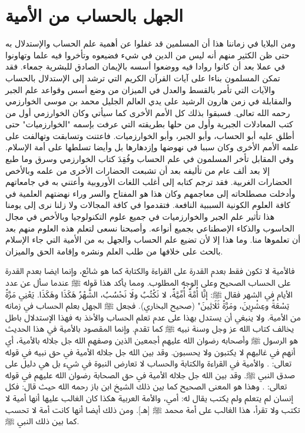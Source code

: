 \section{الجهل بالحساب من الأمية}

ومن البلايا في زماننا هذا أن المسلمين قد غفلوا عن أهمية علم الحساب والإستدلال به حتى ظن الكثير منهم أنه ليس من الدين في شيء فضيعوه وتأخروا فيه علما وتهاونوا في عملا بعد أن كانوا روادا فيه ووضعوا أسسه بالإيمان الصادق للبشرية جمعاء. فقد تمكن المسلمون  بناءا على آيات القرآن الكريم التي ترشد إلى الإستدلال بالحساب والآيات التي تأمر بالقسط والعدل في الميزان من وضع أسس وقواعد علم الجبر والمقابلة في زمن هارون الرشيد على يدي العالم الجليل محمد بن موسى الخوارزمي رحمه الله تعالى. فسبقوا بذلك كل الأمم الأخرى كما سيأتي وكان الخوارزمي أول من كتب المعادلات الجبرية وأول من حلها بطريقته التي عرفت بإسمه "الخوارزميات" حتى أطلق عليه أبو الحساب، وأبو الجبر، وأبو الخوارزميات. فاعتنت وتسابقت وتهالفت على علمه الأمم الأخرى وكان سببا في نهوضها وإزدهارها بل وأيضا تسلطها على أمة الإسلام. وفي المقابل تأخر المسلمون في علم الحساب وفُقِدَ كتاب الخوارزمي وسرق وما طبع إلا بعد ألف عام من تأليفه بعد أن تشبعت الحضارات الأخرى من علمه وبالأخص الحضارات الغربية. فقد ترجم كتابه إلى أغلب اللغات الأوروبية وأعتني به في جامعاتهم وأدخلت مصطلحاته إلى معاجمهم وكان هذا هو المفتاح والسر وراء نهضتهم العلمية في كافة العلوم الكونية السببية النافعة. فتقدموا في كافة المجالات ولا زلنا نرى إلى يومنا هذا تأثير علم الجبر والخوارزميات في جميع علوم التكنولوجيا وبالأخص في مجال الحاسوب والذكاء الإصطناعي بجميع أنواعه. وأصبحنا نسعى لتعلم هذه العلوم منهم بعد أن تعلموها منا. وما هذا إلا لأن تضيع علم الحساب والجهل به من الأمية التي جاء الإسلام بالحث على خلافها من طلب العلم ونشره وإقامة الحق والميزان. 

فالأمية لا تكون فقط بعدم القدرة على القراءة والكتابة كما هو شائع، وإنما ايضا بعدم القدرة على الحساب الصحيح وعلى الوجه المطلوب. ومما يأكد هذا قوله ﷺ عندما سأل عن عدد الأيام في الشهر فقال ﷺ: إنَّا أُمَّةٌ أُمِّيَّةٌ، لا نَكْتُبُ ولَا نَحْسُبُ، الشَّهْرُ هَكَذَا وهَكَذَا. يَعْنِي مَرَّةً تِسْعَةً وعِشْرِينَ، ومَرَّةً ثَلَاثِينَ" {\footnotesize (صحيح البخاري)}. فجعل ﷺ الجهل بعلم الحساب في زمانه من الأمية. ولا ينبغي أن يستدل بهذا على عدم تعلم الحساب والأخذ به فهذا الإستدلال باطل يخالف كتاب الله عز وجل وسنة نبيه ﷺ كما تقدم. وإنما المقصود بالأمية في هذا الحديث هو الرسول ﷺ وأصحابه رضوان الله عليهم أجمعين الذين وصفهم الله جل جلاله بالأمية، أي أنهم في غالبهم لا يكتبون ولا يحسبون. وقد بين الله جل جلاله الأمية في حق نبيه في قوله تعالى: \quranayah*[7][158][21]{\footnotesize \surahname*[7]}. والأمية في القراءة والكتابة والحساب لا تعارض النبوة في شيء بل هي دليل على صدق النبي ﷺ. وقد بين الله جل جلاله الأمية في حق الصحابة رضوان الله عليهم في قوله تعالى: \quranayah*[62][2]{\footnotesize \surahname*[62]}. وهذا هو المعنى الصحيح كما بين ذلك الشيخ ابن باز رحمه الله حيث قال: فكل إنسان لم يتعلم ولم يكتب يقال له: أمي، والأمة العربية هكذا كان الغالب عليها أنها أمية لا تكتب ولا تقرأ، هذا الغالب على أمة محمد ﷺ [هـ]. ومن ذلك أيضا أنها كانت أمة لا تحسب كما بين ذلك النبي ﷺ.

